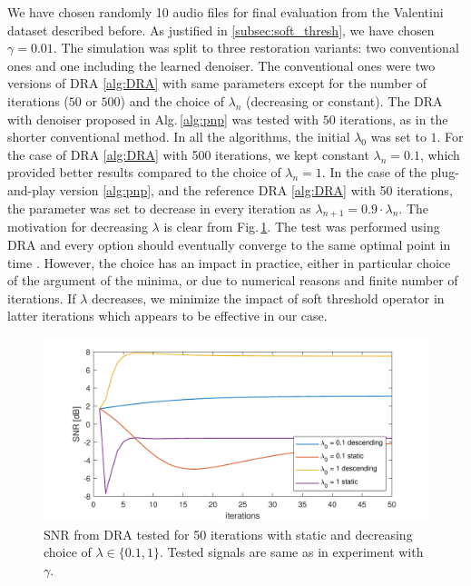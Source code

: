 \documentclass[conference]{IEEEtran}
\begin{document}
We have chosen randomly 10 audio files for final evaluation from the Valentini dataset \cite{ValentiniBotinhao2017} described before.
As justified in \ref{subsec:soft_thresh}, we have chosen $\gamma = 0.01$.
The simulation was split to three restoration variants: two conventional ones and one including the learned denoiser.
The conventional ones were two versions of DRA \ref{alg:DRA} with same parameters except for the number of iterations ($50$ or $500$) and the choice of $\lambda_n$ (decreasing or constant).
The DRA with denoiser proposed in Alg.\,\ref{alg:pnp} was tested with $50$ iterations,
as in the shorter conventional method.
In all the algorithms, the initial $\lambda_0$ was set to $1$.
For the case of DRA \ref{alg:DRA} with 500 iterations, we kept constant $\lambda_n = 0.1$, which provided better results compared to the choice of $\lambda_n = 1$.
In the case of the plug-and-play version \ref{alg:pnp}, and the reference DRA \ref{alg:DRA} with 50 iterations, the parameter was set to decrease in every iteration as $\lambda_{n+1} = 0.9\cdot\lambda_n$.
The motivation for decreasing $\lambda$ is clear from Fig.\,\ref{fig:lamdadesc}.
The test was performed using DRA and every option should eventually converge to the same optimal point in time \cite{Combettes2011}.
However, the choice has an impact in practice, either in particular choice of the argument of the minima, or due to numerical reasons and finite number of iterations.
If $\lambda$ decreases, we minimize the impact of soft threshold operator in latter iterations which appears to be effective in our case.

\begin{figure}[!h]
	\centering
	\includegraphics[width=1\linewidth]{figures/lamda_desc}
	\caption{SNR from DRA tested for 50 iterations with static and decreasing choice of $\lambda \in \{0.1,1 \}$.
	Tested signals are same as in experiment with $\gamma$.}
	\label{fig:lamdadesc}
\end{figure}
\end{document}
